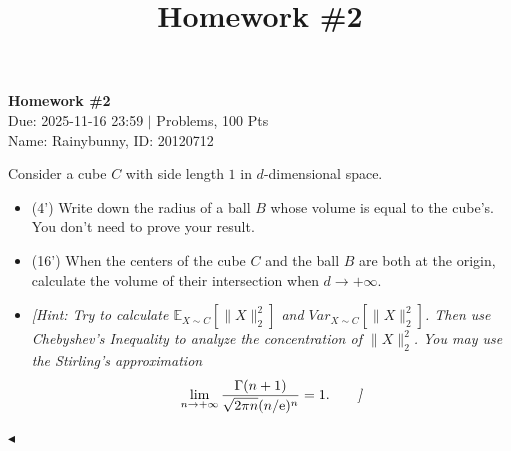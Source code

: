 ﻿\documentclass[11pt]{article}
\title{Homework \#2}
\newenvironment{problem}[2][Problem]{\begin{trivlist}
\item[\hskip \labelsep {\bfseries #1}\hskip \labelsep {\bfseries #2.}]}{\hfill$\blacktriangleleft$\end{trivlist}}
\begin{document}
\pagestyle{fancy}
\chead{}

\begin{center}
    {\LARGE \bf Homework \#2}\\
    {Due: 2025-11-16 23:59 \quad$|$ Problems, 100 Pts}\\
    {Name: Rainybunny, ID: 20120712}            %
\end{center}



\begin{problem}{1 (20')} Consider a cube $C$ with side length $1$ in $d$-dimensional space.
\begin{itemize}
    \item [(1)] (4') Write down the radius of a ball $B$ whose volume is equal to the cube's. You don't need to prove your result.
    \item [(2)] (16') When the centers of the cube $C$ and the ball $B$ are both at the origin, calculate the volume of their intersection when $d\to+\infty$.
    \item [] \textit{[Hint: Try to calculate $\mathbb{E}_{X\sim C}[\|X\|_2^2]$ and $Var_{X\sim C}[\|X\|_2^2]$. Then use Chebyshev's Inequality to analyze the concentration of $\|X\|_2^2$. You may use the Stirling's approximation}
    \begin{align*}
        \lim_{n\to+\infty}\frac{\Gamma(n+1)}{\sqrt{2\pi n}(n/\mathrm{e})^n}=1.\tag*{\textit{]}}
    \end{align*}
\end{itemize}
\end{problem}
\end{document}

